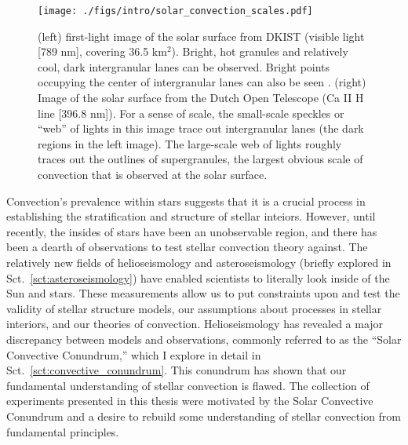 \begin{figure}[ht!]
\texttt{[image: ./figs/intro/solar\_convection\_scales.pdf]}
\caption[Images of solar granulation and supergranulation.]
{
	(left) first-light image of the solar surface from DKIST (visible light [789 nm], covering 36.5 km$^2$).
	Bright, hot granules and relatively cool, dark intergranular lanes can be observed.
	Bright points occupying the center of intergranular lanes can also be seen \citep{vankooten&cranmer2017}.
	(right) Image of the solar surface from the Dutch Open Telescope (Ca II H line [396.8 nm]).
	For a sense of scale, the small-scale speckles or ``web'' of lights in this image trace out intergranular lanes (the dark regions in the left image).
	The large-scale web of lights roughly traces out the outlines of supergranules, the largest obvious scale of convection that is observed at the solar surface.
	\label{fig:solar_convection_scales} 
}
\end{figure}

Convection's prevalence within stars suggests that it is a crucial process in establishing the stratification and structure of stellar inteiors.
However, until recently, the insides of stars have been an unobservable region, and there has been a dearth of observations to test stellar convection theory against.
The relatively new fields of helioseismology and asteroseismology (briefly explored in Sct.~\ref{sct:asteroseismology}) have enabled scientists to literally look inside of the Sun and stars.
These measurements allow us to put constraints upon and test the validity of stellar structure models, our assumptions about processes in stellar interiors, and our theories of convection.
Helioseismology has revealed a major discrepancy between models and observations, commonly referred to as the ``Solar Convective Conundrum,'' which I explore in detail in Sct.~\ref{sct:convective_conundrum}.
This conundrum has shown that our fundamental understanding of stellar convection is flawed.
The collection of experiments presented in this thesis were motivated by the Solar Convective Conundrum and a desire to rebuild some understanding of stellar convection from fundamental principles.

